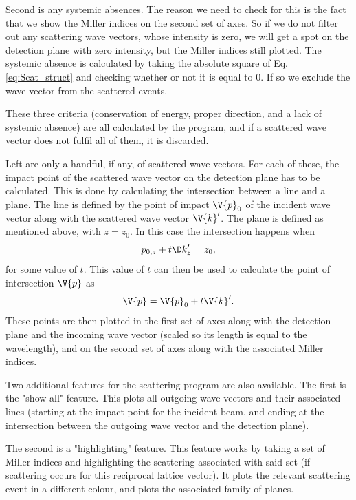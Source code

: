 \documentclass[main.tex]{subfiles}
\begin{document}
	Second is any systemic absences. The reason we need to check for this is the fact that we show the Miller indices on the second set of axes. So if we do not filter out any scattering wave vectors, whose intensity is zero, we will get a spot on the detection plane with zero intensity, but the Miller indices still plotted. The systemic absence is calculated by taking the absolute square of  Eq. \eqref{eq:Scat_struct} and checking whether or not it is equal to 0. If so we exclude the wave vector from the scattered events.
	
	These three criteria (conservation of energy, proper direction, and a lack of systemic absence) are all calculated by the program, and if a scattered wave vector does not fulfil all of them, it is discarded.
	
	Left are only a handful, if any, of scattered wave vectors. For each of these, the impact point of the scattered wave vector on the detection plane has to be calculated. This is done by calculating the intersection between a line and a plane. The line is defined by the point of impact $ \V{p}_0 $ of the incident wave vector along with the scattered wave vector $ \V{k}' $. The plane is defined as mentioned above, with $ z=z_0 $. In this case the intersection happens when
	\begin{equation}
		p_{0,z} + t\D k'_z = z_0,
	\end{equation}
	for some value of $ t $. This value of $ t $ can then be used to calculate the point of intersection $ \V{p} $ as
	\begin{equation}
		\V{p} = \V{p}_0 + t \V{k}'.
	\end{equation}
	These points are then plotted in the first set of axes along with the detection plane and the incoming wave vector (scaled so its length is equal to the wavelength), and on the second set of axes along with the associated Miller indices.
	
	Two additional features for the scattering program are also available. The first is the "show all" feature. This plots all outgoing wave-vectors and their associated lines (starting at the impact point for the incident beam, and ending at the intersection between the outgoing wave vector and the detection plane).
	
	The second is a "highlighting" feature. This feature works by taking a set of Miller indices and highlighting the scattering associated with said set (if scattering occurs for this reciprocal lattice vector). It plots the relevant scattering event in a different colour, and plots the associated family of planes.
	
\end{document}
